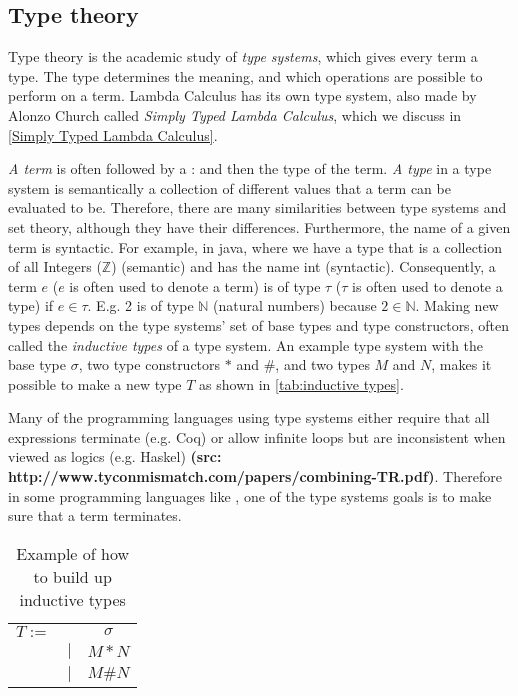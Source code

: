 \subsection{Type theory}
Type theory is the academic study of \emph{type systems}, which gives every term a type. The type determines the meaning, and which operations are possible to perform on a term. Lambda Calculus has its own type system, also made by Alonzo Church called \emph{Simply Typed Lambda Calculus}, which we discuss in \autoref{Simply Typed Lambda Calculus}.

\para
\emph{A term} is often followed by a : and then the type of the term. \emph{A type} in a type system is semantically a collection of different values that a term can be evaluated to be. Therefore, there are many similarities between type systems and set theory, although they have their differences. Furthermore, the name of a given term is syntactic. For example, in java, where we have a type that is a collection of all Integers ($\mathbb{Z}$) (semantic) and has the name int (syntactic). Consequently, a term $e$ ($e$ is often used to denote a term) is of type $\tau$ ($\tau$ is often used to denote a type) if $e \in \tau$. E.g. 2 is of type $\mathbb{N}$ (natural numbers) because $2 \in \mathbb{N}$. Making new types depends on the type systems' set of base types and type constructors, often called the \emph{inductive types} of a type system. An example type system with the base type $\sigma$, two type constructors $*$ and $\#$, and two types $M$ and $N$, makes it possible to make a new type $T$ as shown in \autoref{tab:inductive types}. 

\para
Many of the programming languages using type systems either require that all expressions terminate (e.g. Coq) or allow infinite loops but are inconsistent when viewed as logics (e.g. Haskel) \textbf{(src: http://www.tyconmismatch.com/papers/combining-TR.pdf)}.
Therefore in some programming languages like , one of the type systems goals is to make sure that a term terminates. 

\begin{table}[]
    \centering
    \begin{tabular}{c c c}
         $T :=$&  & $\sigma$\\
         & $|$ & $M * N$ \\
         & $|$ & $M \# N$ \\
    \end{tabular}
    \caption{Example of how to build up inductive types}
    \label{tab:inductive types}
\end{table}


